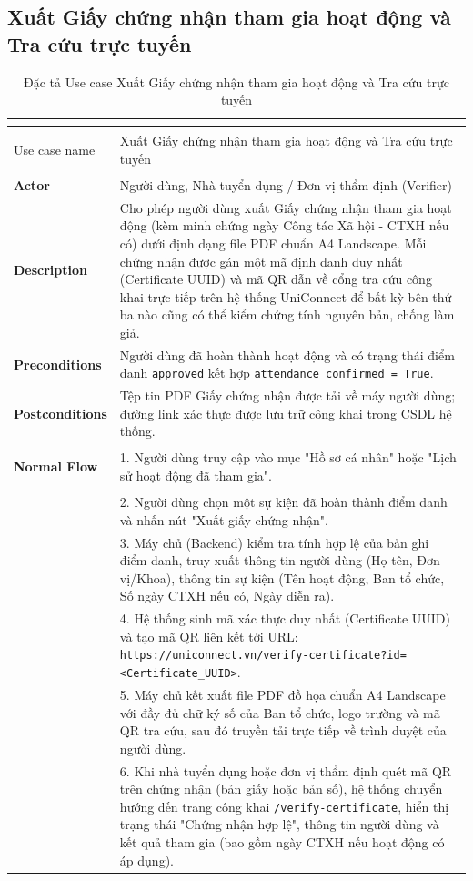 \subsection{Xuất Giấy chứng nhận tham gia hoạt động và Tra cứu trực tuyến}

\renewcommand{\arraystretch}{1.5}
\begin{xltabular}{\textwidth}{|>{\bfseries}p{3.5cm}|X|}
    \caption{Đặc tả Use case Xuất Giấy chứng nhận tham gia hoạt động và Tra cứu trực tuyến} \label{tab:uc_chungnhan} \\
    \hline
    \endfirsthead
    \caption[]{Đặc tả Use case Xuất Giấy chứng nhận tham gia hoạt động và Tra cứu trực tuyến} \\
    \hline
    \endhead
    \hline
    \endfoot
    \hline
    \endlastfoot

    Use case name & Xuất Giấy chứng nhận tham gia hoạt động và Tra cứu trực tuyến \\ \hline
    Actor & Người dùng, Nhà tuyển dụng / Đơn vị thẩm định (Verifier) \\ \hline
    Description & Cho phép người dùng xuất Giấy chứng nhận tham gia hoạt động (kèm minh chứng ngày Công tác Xã hội - CTXH nếu có) dưới định dạng file PDF chuẩn A4 Landscape. Mỗi chứng nhận được gán một mã định danh duy nhất (Certificate UUID) và mã QR dẫn về cổng tra cứu công khai trực tiếp trên hệ thống UniConnect để bất kỳ bên thứ ba nào cũng có thể kiểm chứng tính nguyên bản, chống làm giả. \\ \hline
    Preconditions & Người dùng đã hoàn thành hoạt động và có trạng thái điểm danh \texttt{approved} kết hợp \texttt{attendance\_confirmed = True}. \\ \hline
    Postconditions & Tệp tin PDF Giấy chứng nhận được tải về máy người dùng; đường link xác thực được lưu trữ công khai trong CSDL hệ thống. \\ \hline
    
    \textbf{Normal Flow} & 1. Người dùng truy cập vào mục "Hồ sơ cá nhân" hoặc "Lịch sử hoạt động đã tham gia". \\ 
    & 2. Người dùng chọn một sự kiện đã hoàn thành điểm danh và nhấn nút "Xuất giấy chứng nhận". \\ 
    & 3. Máy chủ (Backend) kiểm tra tính hợp lệ của bản ghi điểm danh, truy xuất thông tin người dùng (Họ tên, Đơn vị/Khoa), thông tin sự kiện (Tên hoạt động, Ban tổ chức, Số ngày CTXH nếu có, Ngày diễn ra). \\ 
    & 4. Hệ thống sinh mã xác thực duy nhất (Certificate UUID) và tạo mã QR liên kết tới URL: \texttt{https://uniconnect.vn/verify-certificate?id=<Certificate\_UUID>}. \\ 
    & 5. Máy chủ kết xuất file PDF đồ họa chuẩn A4 Landscape với đầy đủ chữ ký số của Ban tổ chức, logo trường và mã QR tra cứu, sau đó truyền tải trực tiếp về trình duyệt của người dùng. \\ 
    & 6. Khi nhà tuyển dụng hoặc đơn vị thẩm định quét mã QR trên chứng nhận (bản giấy hoặc bản số), hệ thống chuyển hướng đến trang công khai \texttt{/verify-certificate}, hiển thị trạng thái "Chứng nhận hợp lệ", thông tin người dùng và kết quả tham gia (bao gồm ngày CTXH nếu hoạt động có áp dụng). \\ \hline
    

\end{xltabular}

